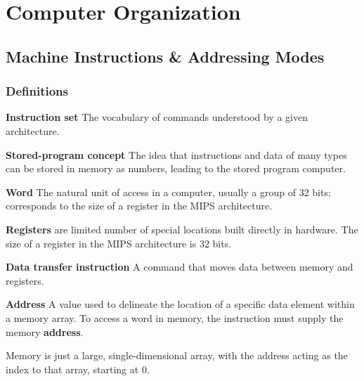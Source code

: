 \documentclass[a4paper,oneside]{book}
\begin{document}
\part{Computer Organization \cite{patterson2013computer}}
\chapter{Machine Instructions \& Addressing Modes}
\section{Definitions}
\begin{definition} 
\textbf{Instruction set} The vocabulary of commands understood by a given architecture.
\end{definition}
\begin{definition}
\textbf{Stored-program concept} The idea that instructions and data of many types can be stored in memory as numbers, leading to the stored program computer.
\end{definition}
\begin{definition}[Word]
\textbf{Word} The natural unit of access in a computer, usually a group of 32 bits; corresponds to the size of a register in the MIPS architecture.
\end{definition}
\begin{definition}[Registers]
\textbf{Registers} are limited number of special locations built directly in hardware. The size of a register in the MIPS architecture is 32 bits.
\end{definition}
\begin{definition}
\textbf{Data transfer instruction} A command that moves data between memory and registers. 
\end{definition}
\begin{definition}[Address]
\textbf{Address} A value used to delineate the location of a specific data element within a memory array. To access a word in memory, the instruction must supply the memory \textbf{address}.
\end{definition}
Memory is just a large, single-dimensional array, with the address acting as the index to that array, starting at 0.
\begin{definition}
\end{definition}
\end{document}
